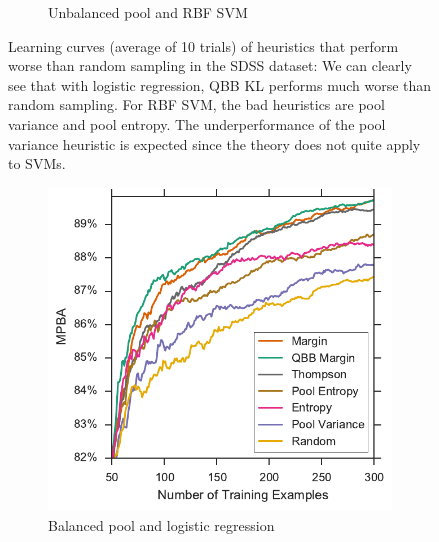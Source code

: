 \begin{figure}[p]
\begin{subfigure}{.5\textwidth}
		\caption{Unbalanced pool and RBF SVM}
		\label{fig:sdss_ur_ind_lower}
	\end{subfigure}
	\caption[Learning curves of heuristics worse than random (SDSS)]{
		Learning curves (average of 10 trials) of heuristics that perform worse than random sampling in the SDSS dataset: We can clearly see that with logistic regression,
		QBB KL performs much worse than random sampling. For 
		RBF SVM, the bad heuristics are pool variance and pool entropy. The underperformance
		of the pool variance heuristic is expected since the theory does not quite apply
		to SVMs.}
	\label{fig:sdss_ind_lower}
\end{figure}


\begin{figure}[p]
	\centering
	\begin{subfigure}{.5\textwidth}
		\centering
		\includegraphics[width=\textwidth]{figures/5_active/sdss_bl_ind_upper}
		\caption{Balanced pool and logistic regression}
		\label{fig:sdss_bl_ind_upper}
	\end{subfigure}%
	\begin{subfigure}{.5\textwidth}
		\centering

\end{subfigure}
\end{figure}
